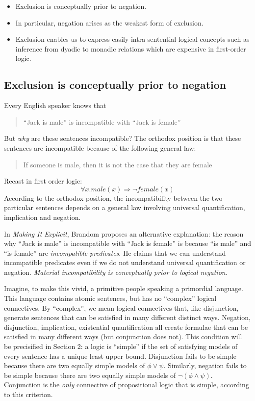 \begin{itemize}

\item Exclusion is conceptually prior to negation.

\item In particular, negation arises as the weakest form of exclusion.

\item Exclusion enables us to express easily intra-sentential logical
  concepts such as inference from dyadic to monadic relations which
  are expensive in first-order logic.

\end{itemize}

\subsection{Exclusion is conceptually prior to negation}

\NI Every English speaker knows that
\begin{quote}
``Jack is male'' is incompatible with ``Jack is female''
\end{quote}

\NI But \emph{why} are these sentences incompatible? The orthodox
position is that these sentences are incompatible because of the
following general law:
\begin{quote}
If someone is male, then it is not the case that they are female
\end{quote}
Recast in first order logic:
\[
\forall x. male(x) \Rightarrow \neg female(x)
\]
According to the orthodox position, the incompatibility between the two particular sentences depends on a general law involving universal quantification, implication and negation. 

In \emph{Making It Explicit}\cite{brandom2}, Brandom proposes an alternative explanation:
the reason why ``Jack is male'' is incompatible with ``Jack is female'' is because ``is male'' and ``is female'' are \emph{incompatible predicates}.
He claims that we can understand incompatible predicates even if we do not understand universal quantification or negation.  \emph{Material incompatibility is
conceptually prior to logical negation.}

Imagine, to make this vivid, a primitive people speaking a
primordial language.  This language contains atomic sentences, but has
no ``complex'' logical connectives.  By ``complex'', we mean logical
connectives that, like disjunction, generate sentences that can be
satisfied in many different distinct ways.  Negation, disjunction,
implication, existential quantification all create formulae that can
be satisfied in many different ways (but conjunction does not). This condition will be
precisified in Section 2: a logic is ``simple'' if the set of
satisfying models of every sentence has a unique least upper
bound. Disjunction fails to be simple because there are two equally
simple models of $\phi \lor \psi$. Similarly, negation fails to be simple
because there are two equally simple models of $\neg (\phi \land
\psi)$. Conjunction is the \emph{only} connective of propositional logic that is simple,
according to this criterion.


